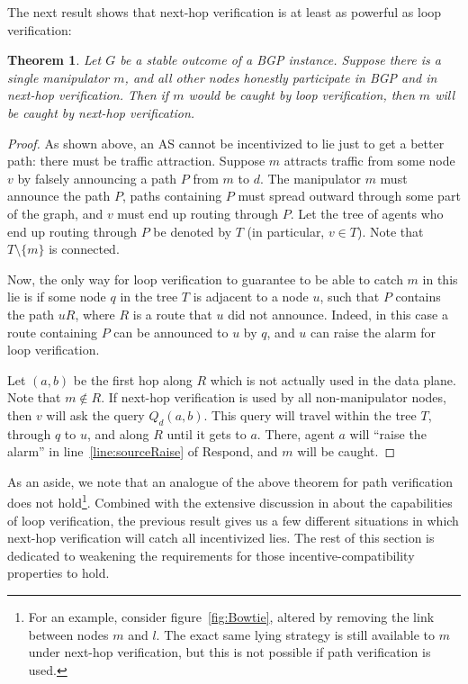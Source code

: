 \documentclass[10pt]{article}
\newtheorem{theorem}{Theorem}
\begin{document}
  The next result shows that next-hop verification is at least as
  powerful as loop verification:
  \begin{theorem}
    Let $G$ be a stable outcome of a BGP instance.
    Suppose there is a single manipulator $m$,
    and all other nodes honestly participate in BGP and in next-hop verification.
    Then if $m$ would be caught by loop verification,
    then $m$ will be caught by next-hop verification.
  \end{theorem}
  \begin{proof}
    As shown above, an AS cannot be incentivized to lie just to get a better
    path: there must be traffic attraction.
    Suppose $m$ attracts traffic from some node $v$ by falsely announcing a path
    $P$ from $m$ to $d$.
    The manipulator $m$ must announce the path $P$, paths containing $P$
    must spread outward through some part of the graph, and $v$ must end up
    routing through $P$.
    Let the tree of agents who end up routing through $P$ be denoted by $T$
    (in particular, $v\in T$). Note that $T\setminus \{m\}$ is connected.


    Now, the only way for loop verification to guarantee to be able to
    catch $m$ in this lie is if some
    node $q$ in the tree $T$ is adjacent to a node $u$, such that $P$ contains
    the path $uR$, where $R$ is a route that $u$ did not announce. Indeed,
    in this case a route containing $P$ can be announced to $u$ by $q$,
    and $u$ can raise the alarm for loop verification.

    Let $(a,b)$ be the first hop along $R$ which is not actually used in the
    data plane. Note that $m\notin R$.
    If next-hop verification is used by all non-manipulator nodes, then $v$ will
    ask the query $Q_d(a,b)$. This query will travel within the tree $T$,
    through $q$ to $u$, and along $R$ until it gets to $a$.
    There, agent $a$ will ``raise the alarm'' in line~\ref{line:sourceRaise} of {\sc
    Respond}, and $m$ will be caught.
  \end{proof}
  As an aside, we note that an analogue of the above theorem for path
  verification does not hold\footnote{
    For an example, consider figure~\ref{fig:Bowtie}, altered by removing the
    link between nodes $m$ and $l$. The exact same lying strategy is still
    available to $m$ under next-hop verification, but this is not possible if
    path verification is used.
  }.
  Combined with the extensive discussion in \cite{Attraction} about the capabilities of loop verification,
  the previous result gives us a few different situations in which
  next-hop verification will catch all incentivized lies.
  The rest of this section is dedicated to weakening the requirements
  for those incentive-compatibility properties to hold.
\end{document}
